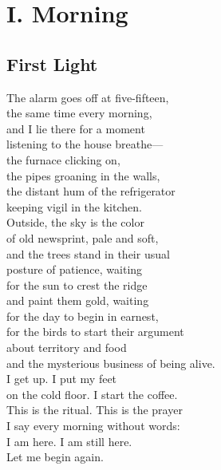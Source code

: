 \documentclass[
    language=english,
    doctype=poetry-collection,
    institution=none,
]{../../omnilatex}
\begin{document}
\chapter*{I. Morning}

\begin{center}
\begin{minipage}{0.7\textwidth}
\section*{First Light}

The alarm goes off at five-fifteen,\\
the same time every morning,\\
and I lie there for a moment\\
listening to the house breathe---\\

the furnace clicking on,\\
the pipes groaning in the walls,\\
the distant hum of the refrigerator\\
keeping vigil in the kitchen.\\

Outside, the sky is the color\\
of old newsprint, pale and soft,\\
and the trees stand in their usual\\
posture of patience, waiting\\

for the sun to crest the ridge\\
and paint them gold, waiting\\
for the day to begin in earnest,\\
for the birds to start their argument\\

about territory and food\\
and the mysterious business of being alive.\\
I get up. I put my feet\\
on the cold floor. I start the coffee.\\

This is the ritual. This is the prayer\\
I say every morning without words:\\
I am here. I am still here.\\
Let me begin again.
\end{minipage}
\end{center}
\end{document}

